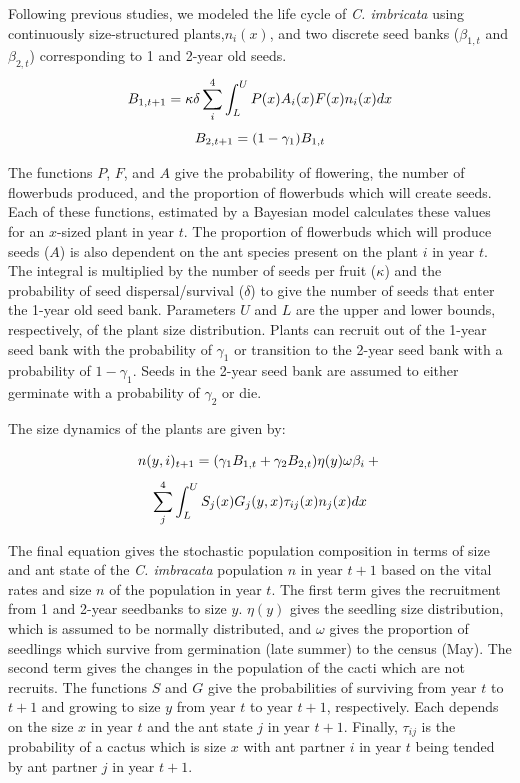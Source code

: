 \documentclass[12pt,a4paper]{article}
\begin{document}
		Following previous studies, we modeled the life cycle of \textit{C. imbricata} using continuously size-structured plants,$n_i(x)$, and two discrete seed banks ($\beta_{1,t}$ and $\beta_{2,t}$) corresponding to 1 and 2-year old seeds.
		$$
		B_{1, t+1} = \kappa \delta \sum_{i}^{4} \int_L^U P(x) A_i(x) F(x)n_i(x) dx \\
		$$
		$$
		B_{2,t+1} =  (1 - \gamma_1)B_{1,t}\\
		$$
		
		The functions $P$, $F$, and $A$ give the probability of flowering, the number of flowerbuds produced, and the proportion of flowerbuds which will create seeds. 
		Each of these functions, estimated by a Bayesian model calculates these values for an $x$-sized plant in year $t$. 
		The proportion of flowerbuds which will produce seeds ($A$) is also dependent on the ant species present on the plant $i$ in year $t$. 
		The integral is multiplied by the number of seeds per fruit ($\kappa$) and the probability of seed dispersal/survival ($\delta$) to give the number of seeds that enter the 1-year old seed bank. 
		Parameters $U$ and $L$ are the upper and lower bounds, respectively, of the plant size distribution. 
		Plants can recruit out of the 1-year seed bank with the probability of $\gamma_1$ or transition to the 2-year seed bank with a probability of $1 - \gamma_1$. 
		Seeds in the 2-year seed bank are assumed to either germinate with a probability of $\gamma_2$ or die. 
		
		The size dynamics of the plants are given by:
		
		$$
		n(y,i)_{t+1} = (\gamma_1 B_{1,t} + \gamma_2 B_{2,t}) \eta(y) \omega \beta_i  + \\
		$$
		$$
		\sum_{j}^{4} \int_L^U S_j(x) G_j(y,x) \tau_{ij}(x) n_j(x) dx \\
		$$
		
		The final equation gives the stochastic population composition in terms of size and ant state of the \textit{C. imbracata} population $n$ in year $t+1$ based on the vital rates and size $n$ of the population in year $t$.
		The first term gives the recruitment from 1 and 2-year seedbanks to size $y$.
		$\eta(y)$ gives the seedling size distribution, which is assumed to be normally distributed, and $\omega$ gives the proportion of seedlings which survive from germination (late summer) to the census (May). 
		The second term gives the changes in the population of the cacti which are not recruits. 
		The functions $S$ and $G$ give the probabilities of surviving from year $t$ to $t+1$ and growing to size $y$ from year $t$ to year $t+1$, respectively. 
		Each depends on the size $x$ in year $t$ and the ant state $j$ in year $t+1$. 
		Finally, $\tau_{ij}$ is the probability of a cactus which is size $x$ with ant partner $i$ in year $t$ being tended by ant partner $j$ in year $t+1$. 
		
\end{document}
